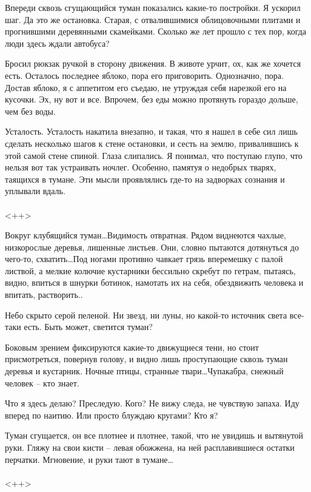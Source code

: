 \documentclass[a4paper]{book}
\begin{document}
Впереди сквозь сгущающийся туман показались какие-то постройки. Я ускорил шаг. Да это же остановка. Старая, с отвалившимися облицовочными плитами и прогнившими деревянными скамейками. Сколько же лет прошло с тех пор, когда люди здесь ждали автобуса?

Бросил рюкзак ручкой в сторону движения. В животе урчит, ох, как же хочется есть. Осталось последнее яблоко, пора его приговорить. Однозначно, пора. Достав яблоко, я с аппетитом его съедаю, не утруждая себя нарезкой его на кусочки. Эх, ну вот и все. Впрочем, без еды можно протянуть гораздо дольше, чем без воды. 

Усталость. Усталость накатила внезапно, и такая, что я нашел в себе сил лишь сделать несколько шагов к стене остановки, и сесть на землю, привалившись к этой самой стене спиной. Глаза слипались. Я понимал, что поступаю глупо, что нельзя вот так устраивать ночлег. Особенно, памятуя о недобрых тварях, таящихся в тумане. Эти мысли проявлялись где-то на задворках сознания и уплывали вдаль. 
\\
\paragraph{}<++>


Вокруг клубящийся туман\ldots Видимость отвратная. Рядом виднеются чахлые, низкорослые деревья, лишенные листьев. Они, словно пытаются дотянуться до чего-то, схватить\ldots Под ногами противно чавкает грязь вперемешку с палой листвой, а мелкие колючие кустарники бессильно скребут по гетрам, пытаясь, видно, впиться в шнурки ботинок, намотать их на себя, обездвижить человека и впитать, растворить.. 

Небо скрыто серой пеленой. Ни звезд, ни луны, но какой-то источник света все-таки есть. Быть может, светится туман? 

Боковым зрением фиксируются какие-то движущиеся тени, но стоит присмотреться, повернув голову, и видно лишь проступающие сквозь туман деревья и кустарник. Ночные птицы, странные твари\ldots Чупакабра, снежный человек -- кто знает. 

Что я здесь делаю? Преследую. Кого? Не вижу следа, не чувствую запаха. Иду вперед по наитию. Или просто блуждаю кругами? Кто я? 

Туман сгущается, он все плотнее и плотнее, такой, что не увидишь и вытянутой руки. Гляжу на свои кисти -- левая обожжена, на ней расплавившиеся остатки перчатки. Мгновение, и руки тают в тумане\ldots
\\
\paragraph{}<++>
\end{document}
